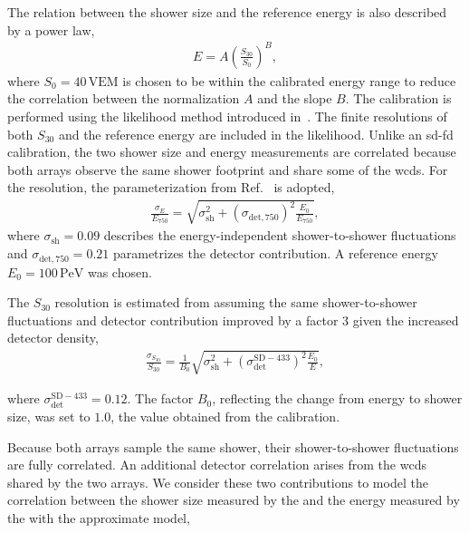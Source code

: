 \documentclass[main.tex]{subfiles}
\begin{document}
The relation between the  shower size and the  reference energy is also described by a power law,
\begin{align}
    E
    =
    A
    \left(
        \frac{S_{30}}{S_0}
    \right)^B,
    \label{eq:sd433_calibration}
\end{align}
where $S_0=40\,\mathrm{VEM}$ is chosen to be within the calibrated energy range to reduce the correlation between the normalization $A$ and the slope $B$.
The calibration is performed using the likelihood method introduced in~\cite{Dembinski:2016:Likelihood}.
The finite resolutions of both $S_{30}$ and the  reference energy are included in the likelihood.
Unlike an \gls{sd}-\gls{fd} calibration, the two shower size and energy measurements are correlated because both arrays observe the same shower footprint and share some of the \gls{wcd}s.
For the  resolution, the parameterization from Ref.~\cite{PierreAuger:2021:InfillSpectrum} is adopted,
\begin{align}
    \frac{\sigma_{E}}{E_{750}}
    =
    \sqrt{
        \sigma_{\mathrm{sh}}^2
        +
        \left(\sigma_{\mathrm{det},750}\right)^2
        \frac{E_0}{E_{750}}
    },
\end{align}
where $\sigma_{\mathrm{sh}}=0.09$ describes the energy-independent shower-to-shower fluctuations and $\sigma_{\mathrm{det},750}=0.21$ parametrizes the detector contribution. A reference energy $E_0=100\,\mathrm{PeV}$ was chosen.

The $S_{30}$ resolution is estimated from  assuming the same shower-to-shower fluctuations and detector contribution improved by a factor 3 given the increased detector density,
\begin{align}
    \frac{\sigma_{S_{30}}}{S_{30}}
    =
    \frac{1}{B_0}
    \sqrt{
        \sigma_{\mathrm{sh}}^2
        +
        \left(\sigma_{\mathrm{det}}^{\mathrm{SD-433}}\right)^2
        \frac{E_0}{E}
    },
\end{align}

where $\sigma_{\mathrm{det}}^{\mathrm{SD-433}}=0.12$. The factor $B_0$, reflecting the change from energy to shower size, was set to $1.0$, the value obtained from the calibration.

Because both arrays sample the same shower, their shower-to-shower fluctuations are fully correlated.
An additional detector correlation arises from the \gls{wcd}s shared by the two arrays.
We consider these two contributions to model the correlation between the shower size measured by the  and the energy measured by the  with the approximate model,
\end{document}
